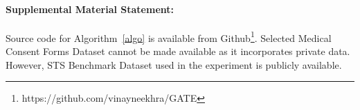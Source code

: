 \documentclass[runningheads]{llncs}
\begin{document}


\paragraph*{Supplemental Material Statement:} 
Source code for Algorithm~\ref{algo} is available from Github\footnote{https://github.com/vinayneekhra/GATE}. 
Selected Medical Consent Forms Dataset cannot be made available as it incorporates private data. However, STS Benchmark Dataset used in the experiment is publicly available.
\end{document}

